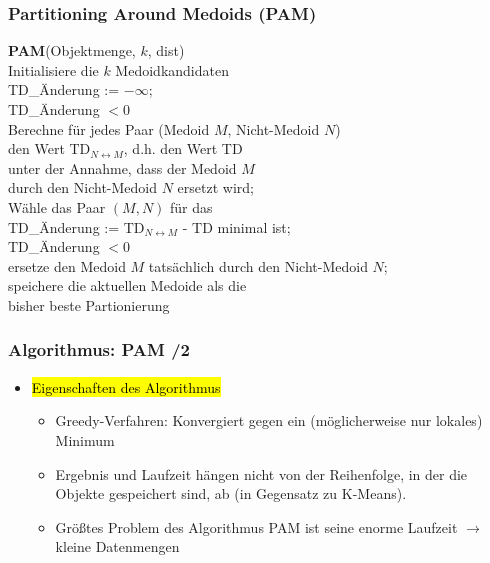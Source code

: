 
\begin{frame}
\frametitle{Partitioning Around Medoids (PAM)}

\begin{algo}
\textbf{PAM}(Objektmenge, $k$, dist) \\
\1 \textrm{Initialisiere die $k$ Medoidkandidaten} \\
\1 TD\_Änderung := $-\infty$; \\
\1  TD\_Änderung $< 0$  \\
\2 \textrm{Berechne für jedes Paar (Medoid $M$, Nicht-Medoid $N$)}\\
\3 \textrm{den Wert} TD$_{N\leftrightarrow M}$, \textrm{d.h. den Wert} TD \\
\3 \textrm{unter der Annahme, dass der Medoid $M$} \\
\3 \textrm{durch den Nicht-Medoid $N$ ersetzt wird;}  \\
\2 \textrm{Wähle das Paar $(M, N)$ für das} \\
\3 TD\_Änderung := TD$_{N\leftrightarrow M}$ - TD \textrm{minimal ist;} \\
\2 TD\_Änderung $< 0$  \\
\3 \textrm{ersetze den Medoid $M$ tatsächlich durch den Nicht-Medoid $N$;} \\
\3 \textrm{speichere die aktuellen Medoide als die} \\
\4 \textrm{bisher beste Partionierung} 
\end{algo}

\end{frame}


\begin{frame}
\frametitle{Algorithmus: PAM /2}

\begin{itemize}

\item\hl{Eigenschaften des Algorithmus}
\begin{itemize}
\item Greedy-Verfahren: Konvergiert gegen ein (möglicherweise nur
  lokales) Minimum  
\item Ergebnis und Laufzeit hängen nicht von der Reihenfolge, in der
  die Objekte gespeichert sind, ab (in Gegensatz zu K-Means). 
\item Größtes Problem des Algorithmus PAM ist seine enorme Laufzeit
  $\rightarrow$ kleine Datenmengen   
\end{itemize}
\end{itemize}

\end{frame}

